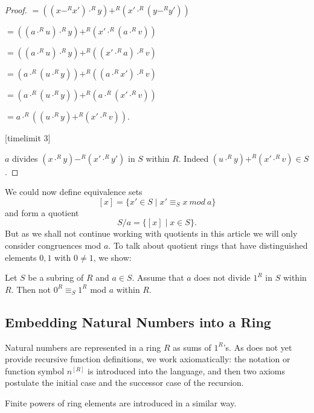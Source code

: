 \documentclass[11pt]{article}
\begin{document}
\begin{forthel}
\begin{proof}
$ = ((x -^{R} x') \cdot^{R} y) +^{R} (x' \cdot^{R} (y -^{R} y'))$

$ = ((a \cdot^{R} u) \cdot^{R} y) +^{R} (x' \cdot^{R} (a \cdot^{R} v))$

$ = ((a \cdot^{R} u) \cdot^{R} y) +^{R} ((x' \cdot^{R} a) \cdot^{R} v)$

$ = (a \cdot^{R} (u \cdot^{R} y)) +^{R} ((a \cdot^{R} x') \cdot^{R} v)$

$ = (a \cdot^{R} (u \cdot^{R} y)) +^{R} (a \cdot^{R} (x' \cdot^{R} v))$

$ = a \cdot^{R} ((u \cdot^{R} y) +^{R} (x' \cdot^{R} v))$.

[timelimit 3]

$a$ divides $(x \cdot^{R} y) -^{R} (x' \cdot^{R} y')$
in $S$ within $R$. Indeed
$(u \cdot^{R} y) +^{R} (x' \cdot^{R} v) \in S$.
\end{proof}

\end{forthel}
We could now define equivalence sets 
%
$$[x]=\{x' \in S \mid x' \equiv_{S} x \ mod \ a\}$$
%
and form a quotient
%
$$ S/a = \{[x]\mid x \in S\}.$$
%
But as we shall not continue working with quotients in this article
we will only consider congruences mod $a$. To talk about 
quotient rings that have distinguished elements $0,1$ with 
$0 \neq 1$, we show:
\begin{forthel}
\begin{lemma}
Let $S$ be a subring of $R$ and $a \in S$.
Assume that $a$ does not divide $1^{R}$ in $S$ within $R$.
Then not $0^{R} \equiv_{S} 1^{R}$ mod $a$ within $R$.
\end{lemma}


\end{forthel}

\subsection{Embedding Natural Numbers into a Ring}

Natural numbers are represented in a ring $R$ as sums of $1^{R}$'s.
As \Naproche{} does not yet provide recursive function definitions,
we work axiomatically: the notation or function symbol $n^{[R]}$ is
introduced into the language, and then two axioms postulate the initial case
and the successor case of the recursion.

Finite powers of ring elements are introduced in a similar way.
\end{document}
